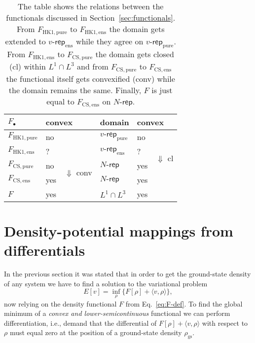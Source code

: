 \documentclass[journal=apcach,manuscript=article,layout=twocolumn]{achemso}
\newcommand{\rhogs}{{\rho_\mathrm{gs}}}
\newcommand{\FHKpure}{F_\mathrm{HK1,pure}}
\newcommand{\FHKens}{F_\mathrm{HK1,ens}}
\newcommand{\FCSpure}{F_\mathrm{CS,pure}}
\newcommand{\FCSens}{F_\mathrm{CS,ens}}
\newcommand{\vrep}{\ensuremath{v\text{-}\mathsf{rep}}}
\newcommand{\vreppure}{\ensuremath{\vrep_\mathrm{pure}}}
\newcommand{\vrepens}{\ensuremath{\vrep_\mathrm{ens}}}
\newcommand{\Nrep}{\ensuremath{N\text{-}\mathsf{rep}}}
\begin{document}
\begin{table}[h]
\begin{tabular}{lll|lll}%
    \hline\hline
    $F_\bullet$ & \multicolumn{2}{l|}{convex} & domain & \multicolumn{2}{l}{convex} \\\hline
    $\FHKpure$ & no & & \vreppure & no \\
    $\FHKens$ & ? & & \vrepens & ? & \multirow{2}{*}{$\Downarrow$ cl} \\
    $\FCSpure$ & no & \multirow{2}{*}{$\Downarrow$ conv} & \Nrep & yes & \\
    $\FCSens$ & yes & & \Nrep & yes & \\
    $F$ & yes & & $L^1 \cap L^3$ & yes & \\
    \hline\hline
\end{tabular}
\caption{\label{tab:DFT-functionals}
The table shows the relations between the functionals discussed in Section~\ref{sec:functionals}. From $\FHKpure$ to $\FHKens$ the domain gets extended to $\vrepens$ while they agree on $\vreppure$. From $\FHKens$ to $\FCSpure$ the domain gets closed (cl) within $L^1\cap L^3$ and from $\FCSpure$ to $\FCSens$ the functional itself gets convexified (conv) while the domain remains the same. Finally, $F$ is just equal to $\FCSens$ on $\Nrep$.
}
\end{table}

\section{Density-potential mappings from differentials}
\label{sec:differentials}

In the previous section it was stated that in order to get the ground-state density of any system we have to find a solution to the variational problem
\begin{equation}\label{eq:E-F-equ2}
    E[v] = \inf_\rho \{ F[\rho] + \langle v,\rho \rangle \},
\end{equation}
now relying on the density functional $F$ from Eq.~\eqref{eq:F-def}.
To find the global minimum of a \emph{convex and lower-semicontinuous} functional we can perform differentiation, i.e., demand that the differential of $F[\rho] + \langle v,\rho \rangle$ with respect to $\rho$ must equal zero at the position of a ground-state density $\rhogs$.
\end{document}
